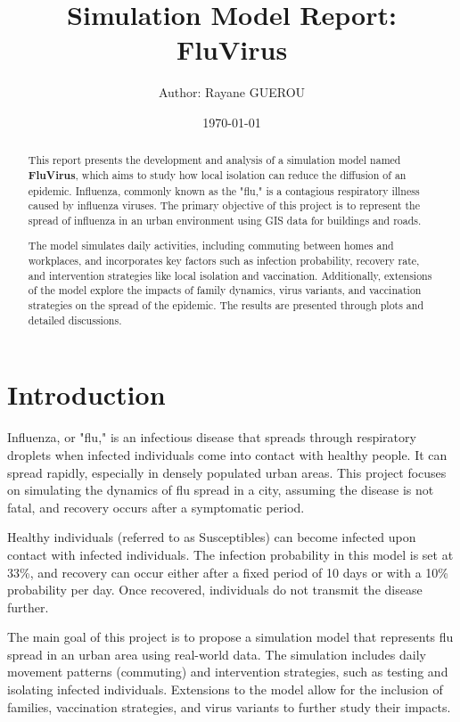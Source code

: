 \documentclass{article}
\begin{document}
\title{Simulation Model Report: \textbf{FluVirus}}
\author{Author: Rayane GUEROU}
\date{\today}
\maketitle

\begin{abstract}
This report presents the development and analysis of a simulation model named \textbf{FluVirus}, which aims to study how local isolation can reduce the diffusion of an epidemic.
Influenza, commonly known as the "flu," is a contagious respiratory illness caused by influenza viruses. The primary objective of this project is to represent the spread of influenza in an urban environment using GIS data for buildings and roads. \newline

The model simulates daily activities, including commuting between homes and workplaces, and incorporates key factors such as infection probability, recovery rate, and intervention strategies like local isolation and vaccination. Additionally, extensions of the model explore the impacts of family dynamics, virus variants, and vaccination strategies on the spread of the epidemic. The results are presented through plots and detailed discussions.

\end{abstract}

\tableofcontents
\newpage

\section{Introduction}
Influenza, or "flu," is an infectious disease that spreads through respiratory droplets when infected individuals come into contact with healthy people. It can spread rapidly, especially in densely populated urban areas. This project focuses on simulating the dynamics of flu spread in a city, assuming the disease is not fatal, and recovery occurs after a symptomatic period.\newline

Healthy individuals (referred to as Susceptibles) can become infected upon contact with infected individuals. The infection probability in this model is set at 33\%, and recovery can occur either after a fixed period of 10 days or with a 10\% probability per day. Once recovered, individuals do not transmit the disease further.\newline

The main goal of this project is to propose a simulation model that represents flu spread in an urban area using real-world data. The simulation includes daily movement patterns (commuting) and intervention strategies, such as testing and isolating infected individuals. Extensions to the model allow for the inclusion of families, vaccination strategies, and virus variants to further study their impacts.
\newline
\end{document}
